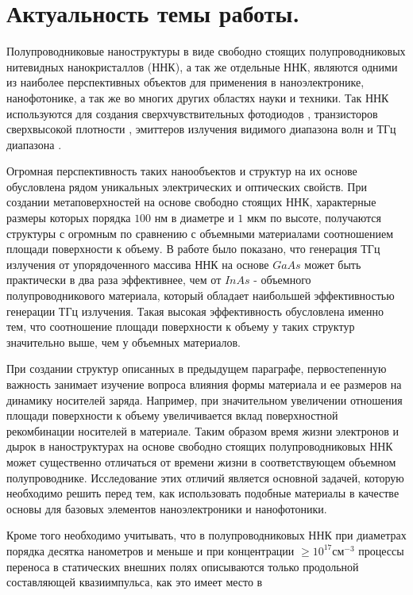 \documentclass[a4paper,14pt,russian]{extreport}
\begin{document}
		\section{Актуальность темы работы.}
		Полупроводниковые наноструктуры в виде свободно стоящих
полупроводниковых нитевидных нанокристаллов (ННК), а так же отдельные ННК, являются одними из наиболее перспективных объектов для применения в наноэлектронике,
нанофотонике, а так же во многих других областях науки и техники. Так ННК используются для создания
сверхчувствительных фотодиодов \cite{semicondNNW2006}, транзисторов сверхвысокой плотности \cite{NNWtransistors}, эмиттеров излучения видимого диапазона волн \cite{singleNNWlaser} и ТГц диапазона \cite{THzGeneration}.\par
Огромная перспективность таких нанообъектов и структур на их основе обусловлена рядом уникальных электрических и оптических свойств. При создании метаповерхностей на основе свободно стоящих ННК, характерные размеры которых порядка $100 \text{ нм}$ в диаметре и $1 \text{ мкм}$ по высоте, получаются структуры с огромным по сравнению с объемными материалами соотношением площади поверхности к объему. В работе \cite{THzGeneration} было показано, что генерация ТГц излучения от упорядоченного массива ННК на основе $GaAs$ может быть практически в два раза эффективнее, чем от $InAs$ - объемного полупроводникового материала, который обладает наибольшей эффективностью генерации ТГц излучения. Такая высокая эффективность обусловлена именно тем, что соотношение площади поверхности к объему у таких структур значительно выше, чем у объемных материалов.\par
 При создании структур описанных в предыдущем параграфе, первостепенную важность занимает изучение вопроса влияния формы материала и ее размеров на динамику носителей заряда. Например, при значительном увеличении отношения площади поверхности к объему увеличивается вклад поверхностной рекомбинации носителей в материале. Таким образом время жизни электронов и дырок в наноструктурах на основе свободно стоящих полупроводниковых ННК может существенно отличаться от времени жизни в соответствующем объемном полупроводнике. Исследование этих отличий является основной задачей, которую необходимо решить перед тем, как использовать подобные материалы в качестве основы для базовых элементов наноэлектроники и нанофотоники.\par
Кроме того необходимо учитывать, что в полупроводниковых ННК при диаметрах порядка десятка нанометров и меньше и при концентрации $\geqslant 10^{17}\text{см}^{-3}$ процессы переноса в статических внешних полях описываются только продольной составляющей квазиимпульса, как это имеет место в
\end{document}
